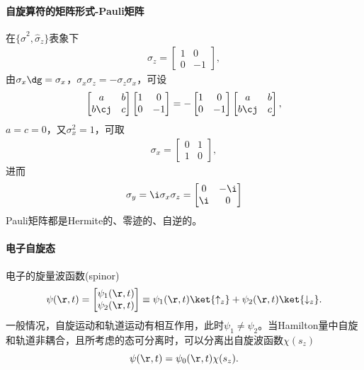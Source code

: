 \paragraph{自旋算符的矩阵形式-Pauli矩阵}在$\{\hat\sigma^2,\hat\sigma_z\}$表象下
\begin{align}
	\sigma_z=\begin{bmatrix}
		1&0\\0&-1
	\end{bmatrix},
\end{align}
由$\sigma_x\dg=\sigma_x$，$\sigma_x\sigma_z=-\sigma_z\sigma_x$，可设
\[
	\begin{bmatrix}
	a&b\\b\cj&c
\end{bmatrix}\begin{bmatrix}
	1&0\\0&-1
\end{bmatrix}=-\begin{bmatrix}
	1&0\\0&-1
\end{bmatrix}\begin{bmatrix}
	a&b\\b\cj&c
\end{bmatrix},
\]
$a=c=0$，又$\sigma_x^2=1$，可取
\begin{align}
	\sigma_x=\begin{bmatrix}
		0&1\\1&0
	\end{bmatrix},
\end{align}
进而
\begin{align}
	\sigma_y=\i\sigma_x\sigma_z=\begin{bmatrix}
		0&-\i\\\i&0
	\end{bmatrix}
\end{align}
Pauli矩阵都是Hermite的、零迹的、自逆的。
\paragraph{电子自旋态}电子的旋量波函数(spinor)
\[
	\psi(\r,t)=\begin{bmatrix}
	\psi_1(\r,t)\\\psi_2(\r,t)
\end{bmatrix}\equiv\psi_1(\r,t)\ket{\uparrow_z}+\psi_2(\r,t)\ket{\downarrow_z}.
\]
一般情况，自旋运动和轨道运动有相互作用，此时$\psi_1\neq\psi_2$。当Hamilton量中自旋和轨道非耦合，且所考虑的态可分离时，可以分离出自旋波函数$\chi(s_z)$
\[
	\psi(\r,t)=\psi_0(\r,t)\chi(s_z).
\]

